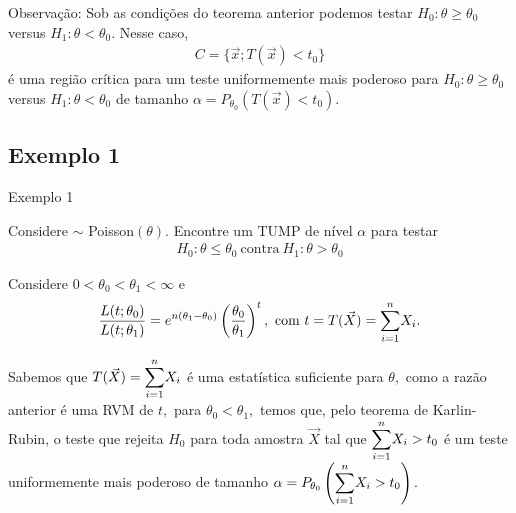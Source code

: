 \documentclass[12pt]{beamer}
\begin{document}
\begin{frame}{}
\begin{block}{Observação:}
\justifying
Sob as condições do teorema anterior podemos testar $H_{0}: \theta \geq \theta_0$ versus $H_{1}: \theta < \theta_0.$ Nesse caso, 
\begin{align*}
    C=\{\Vec{x};T(\Vec{x})< t_{0}\} 
\end{align*}
é uma região crítica para um teste uniformemente mais poderoso para $H_{0}: \theta \geq \theta_0$ versus $H_{1}: \theta < \theta_0$ de tamanho $\alpha=P_{\theta_{0}}(T(\Vec{x})< t_{0})$.
\end{block}
\end{frame}

\subsection{Exemplo 1}
\begin{frame}{Exemplo 1}
\begin{block}{}
\justifying
Considere \seqX $\sim$ Poisson$(\theta).$ Encontre um TUMP de nível $\alpha$ para testar 
\begin{align*}
    H_{0}:\theta\leq \theta_{0}~\text{contra}~H_{1}:\theta> \theta_{0}
\end{align*}
\end{block}
\pause
\begin{block}{}
	\justifying
	Considere $0<\theta_{0}<\theta_{1}<\infty$ e
	\begin{align*}
		\dfrac{L(t;\theta_{0})}{L(t;\theta_{1})}=e^{n(\theta_{1}-\theta_{0})}\left(\dfrac{\theta_{0}}{\theta_{1}}\right)^{t},~\text{com}~t=T(\Vec{X})={\displaystyle \sum_{i=1}^{n}} X_{i}.
	\end{align*}
\end{block}
\end{frame}

\begin{frame}{}
\begin{block}{}
	\justifying
	Sabemos que $T(\Vec{X})={\displaystyle \sum_{i=1}^{n}} X_{i}$ é uma estatística suficiente para $\theta,$ como a razão anterior é uma RVM de $t,$ para $\theta_{0}<\theta_{1},$ temos que, pelo teorema de Karlin-Rubin, o teste que rejeita $H_{0}$ para toda amostra $\Vec{X}$ tal que ${\displaystyle \sum_{i=1}^{n}} X_{i}>t_{0}$ é um teste uniformemente mais poderoso de tamanho $\alpha=P_{\theta_{0}}\left({\displaystyle \sum_{i=1}^{n}} X_{i}>t_{0}\right).$ 
\end{block}
\end{frame}

\end{document}
